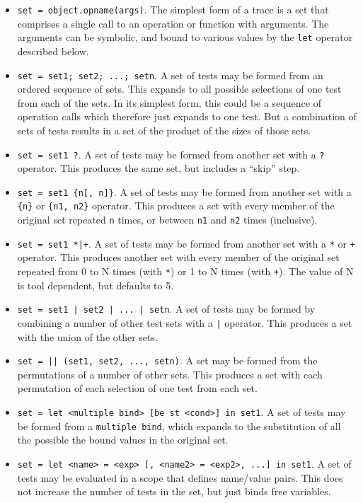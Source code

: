 \documentclass{overturerepchap}
\begin{document}
\begin{itemize}
\item \texttt{set = object.opname(args)}. The simplest form of a trace is a set
that comprises a single call to an operation or function with arguments. The
arguments can be symbolic, and bound to various values by the \texttt{let}
operator described below.
\item \texttt{set = set1; set2; ...; setn}. A set of tests may be formed from
an ordered sequence of sets. This expands to all possible selections of one test
from each of the sets. In its simplest form, this could be a sequence of
operation calls which therefore just expands to one test. But a combination of
sets of tests results in a set of the product of the sizes of those sets.
\item \texttt{set = set1 ?}. A set of tests may be formed from another set with
a \texttt{?} operator. This produces the same set, but includes a ``skip'' step.
\item \texttt{set = set1 \{n[, n]\}}. A set of tests may be formed from another
set with a \texttt{\{n\}} or \texttt{\{n1, n2\}} operator. This produces a set
with every member of the original set repeated \texttt{n} times, or between
\texttt{n1} and \texttt{n2} times (inclusive).
\item \texttt{set = set1 *|+}. A set of tests may be formed from another set
with a \texttt{*} or \texttt{+} operator. This produces another set with every member
of the original set repeated from 0 to N times (with \texttt{*}) or 1 to N times
(with \texttt{+}). The value of N is tool dependent, but defaults to 5.
\item \texttt{set = set1 | set2 | ... | setn}. A set of tests may be formed by
combining a number of other test sets with a \texttt{|} operator. This produces
a set with the union of the other sets.
\item \texttt{set = || (set1, set2, ..., setn)}. A set may be formed from the
permutations of a number of other sets. This produces a set with each
permutation of each selection of one test from each set.
\item \texttt{set = let <multiple bind> [be st <cond>] in set1}. A set of
tests may be formed from a \texttt{multiple bind}, which expands to the
substitution of all the possible the bound values in the original set.
\item \texttt{set = let <name> = <exp> [, <name2> = <exp2>, ...] in set1}. A set
of tests may be evaluated in a scope that defines name/value pairs. This does
not increase the number of tests in the set, but just binds free variables.
\end{itemize}
\end{document}
